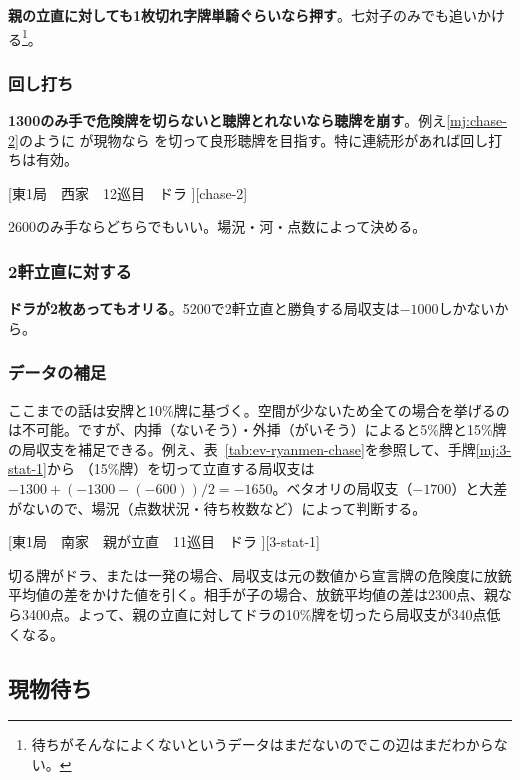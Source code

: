 \documentclass[10pt, twocolumn]{article}
\begin{document}
\textbf{親の立直に対しても1枚切れ字牌単騎ぐらいなら押す}\citep[][pp.~133--134]{miinin-choice}。七対子のみでも追いかける\footnote{待ちがそんなによくないというデータはまだないのでこの辺はまだわからない。}。

\subsubsection*{回し打ち}

\textbf{1300のみ手で危険牌を切らないと聴牌とれないなら聴牌を崩す}\citep[][pp.~137--138]{miinin-choice}。例え\ref{mj:chase-2}のように  が現物なら  を切って良形聴牌を目指す。特に連続形があれば回し打ちは有効。

[東1局　西家　12巡目　ドラ ][chase-2]

2600のみ手ならどちらでもいい。場況・河・点数によって決める。

\subsubsection*{2軒立直に対する}

\textbf{ドラが2枚あってもオリる}\citep[][pp.~153--154]{miinin-choice}。5200で2軒立直と勝負する局収支は$-1000$しかないから。

\subsubsection*{データの補足} 

ここまでの話は安牌と10\%牌に基づく。空間が少ないため全ての場合を挙げるのは不可能。ですが、内挿（ないそう）・外挿（がいそう）によると5\%牌と15\%牌の局収支を補足できる。例え、表~\ref{tab:ev-ryanmen-chase}を参照して、手牌\ref{mj:3-stat-1}から  （15\%牌）を切って立直する局収支は$-1300 + (-1300 - (-600)) / 2 = -1650$。ベタオリの局収支（$-1700$）と大差がないので、場況（点数状況・待ち枚数など）によって判断する\citep[][pp. 93--95]{miinin-stat}。

[東1局　南家　親が立直　11巡目　ドラ ][3-stat-1]

切る牌がドラ、または一発の場合、局収支は元の数値から宣言牌の危険度に放銃平均値の差をかけた値を引く。相手が子の場合、放銃平均値の差は2300点、親なら3400点。よって、親の立直に対してドラの10\%牌を切ったら局収支が340点低くなる\citep[][p. 95]{miinin-stat}。

\subsection{現物待ち}
\end{document}

